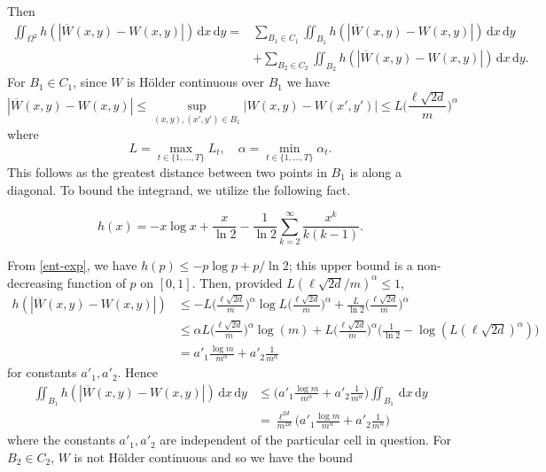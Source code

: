 \documentclass{svproc}
\newcommand{\1}{\mathbbm{1}}
\newcommand{\K}{\Omega}
\newcommand{\set}[1]{\{ #1\}}
\newcommand{\ol}[1]{\overline{#1}}
\newcommand{\dd}{\,\mathrm{d}}
\newcommand{\abs}[1]{| #1 |}
\begin{document}
Then
\begin{align*}\iint_{\K^2}h(|\ol{W}(x,y)-W(x,y)|)\dd x\dd y = &\sum_{B_1\in C_1}\iint_{B_1}h(|\ol{W}(x,y)-W(x,y)|)\dd x\dd y\\ &+\sum_{B_2\in C_2}\iint_{B_2}h(|\ol{W}(x,y)-W(x,y)|)\dd x\dd y.\end{align*}
For $B_1\in C_1$, since $W$ is H\"{o}lder continuous over $B_1$ we have
\begin{equation}|\ol{W}(x,y) - W(x,y)|\leq\sup_{(x,y),(x',y')\in B_1}\abs{W(x,y)-W(x',y')}\leq L\Big(\frac{\ell\sqrt{2d}}{m}\Big)^\alpha\end{equation}
where 
\begin{equation}L= \max_{t\in\set{1,\dots,T}}L_t,\quad \alpha = \min_{t\in\set{1,\dots,T}}\alpha_t.\end{equation}
This follows as the greatest distance between two points in $B_1$ is along a diagonal. To bound the integrand, we utilize the following fact.
\begin{lemma}\label{ent-exp}
\begin{equation}\label{series}h(x) = -x\log x + \frac{x}{\ln 2}-\frac{1}{\ln 2}\sum_{k=2}^\infty \frac{x^k}{k(k-1)}.\end{equation}
\end{lemma}
From \cref{ent-exp}, we have $h(p)\leq -p\log p + p/\ln 2$; this upper bound is a non-decreasing function of $p$ on $[0,1]$. Then, provided $L(\ell\sqrt{2d}/m)^\alpha\leq 1$,
\begin{align*}
h(|\ol{W}(x,y)-W(x,y)|)&\leq -L\Big(\frac{\ell\sqrt{2d}}{m}\Big)^\alpha\log L\Big(\frac{\ell\sqrt{2d}}{m}\Big)^\alpha+\frac{L}{\ln 2}\Big(\frac{
\ell\sqrt{2d}}{m}\Big)^\alpha\\
&\leq\alpha L\Big(\frac{
\ell\sqrt{2d}}{m}\Big)^\alpha\log(m)+L\Big(\frac{\ell\sqrt{2d}}{m}\Big)^\alpha\Big(\frac{1}{\ln 2}-\log(L(\ell\sqrt{2d})^{\alpha})\Big)\\
&= a'_1 \frac{\log m}{m^\alpha}+a'_2 \frac{1}{m^\alpha}
\end{align*}
for constants $a'_1,a'_2$. Hence
\begin{align*}\iint_{B_1}h(|\ol{W}(x,y)-W(x,y)|)\dd x\dd y&\leq\Big(a'_1 \frac{\log m}{m^\alpha}+a'_2 \frac{1}{m^\alpha}\Big)\iint_{B_1}\dd x\dd y\\
&=\frac{\ell^{2d}}{m^{2d}}\Big(a'_1 \frac{\log m}{m^\alpha}+a'_2 \frac{1}{m^\alpha}\Big)
\end{align*}
where the constants $a'_1,a'_2$ are independent of the particular cell in question.
For $B_2\in C_2$, $W$ is not H\"{o}lder continuous and so we have the bound
\end{document}
